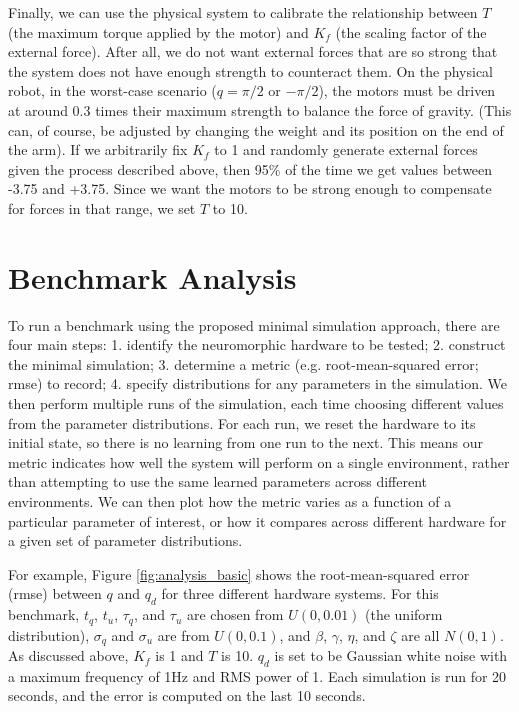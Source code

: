 \documentclass{frontiersSCNS} %
\begin{document}
Finally, we can use the physical system to calibrate the relationship between
$T$ (the maximum torque applied by the motor) and $K_f$ (the scaling factor
of the external force).  After all, we do not want external forces that are
so strong that the system does not have enough strength to counteract them.
On the physical robot, in the worst-case scenario ($q=\pi/2$ or $-\pi/2$),
the motors must be driven at around 0.3 times their maximum strength to
balance the force of gravity.  (This can, of course, be adjusted by changing
the weight and its position on the end of the arm).  If we arbitrarily fix $K_f$ to 1 and randomly
generate external forces given the process described above, then 95\% of
the time we get values between -3.75 and +3.75.  Since we want the motors to
be strong enough to compensate for forces in that range, we set $T$ to 10.

\section{Benchmark Analysis}

To run a benchmark using the proposed
minimal simulation approach, there are four main steps: 1. identify
the neuromorphic hardware to be tested; 2. construct the minimal
simulation; 3. determine a metric (e.g. root-mean-squared error; rmse)
to record; 4. specify distributions for any parameters in the
simulation.  We then perform multiple runs of the simulation, each
time choosing different values from the parameter distributions.  For
each run, we reset the hardware to its initial state, so there is no
learning from one run to the next.  This means our metric indicates
how well the system will perform on a single environment, rather than attempting
to use the same learned parameters across different environments.  We
can then plot how the metric varies as a function of a particular parameter
of interest, or how it compares across different hardware for a
given set of parameter distributions.

For example, Figure \ref{fig:analysis_basic} shows the root-mean-squared
error (rmse) between $q$ and $q_d$ for three different hardware systems.  For
this benchmark, $t_q$, $t_u$, $\tau_q$, and $\tau_u$ are chosen from $U(0, 0.01)$ (the uniform distribution), $\sigma_q$ and $\sigma_u$ are from $U(0, 0.1)$,
and $\beta$, $\gamma$, $\eta$, and $\zeta$ are all $N(0, 1)$.  As discussed
above, $K_f$ is 1 and $T$ is 10.  $q_d$ is set to be Gaussian white noise with
a maximum frequency of 1Hz and RMS power of 1.  Each simulation is run
for 20 seconds, and the error is computed on the last 10 seconds.
\end{document}
